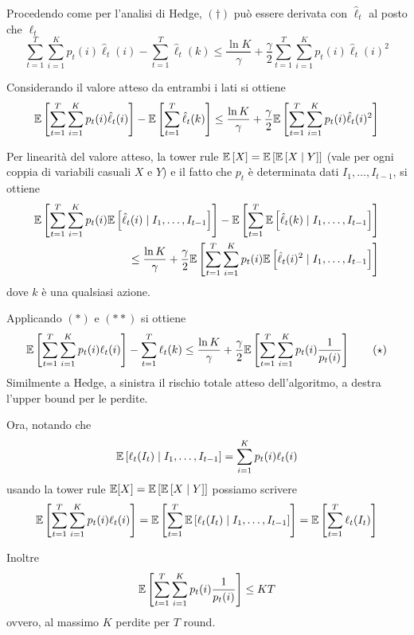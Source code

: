 Procedendo come per l'analisi di Hedge, $(\dag)$ può essere derivata con $\hat \ell_t$ al posto che $\ell_t$
$$ \sum_{t = 1}^T \sum_{i = 1}^K p_t (i) \hat \ell_t (i) - \sum_{t = 1}^T \hat \ell_t (k) \leq \frac{\ln K}{\gamma} + \frac{\gamma}{2} \sum_{t = 1}^T \sum_{i = 1}^K p_t (i) \hat \ell_t (i)^2 $$

Considerando il valore atteso da entrambi i lati si ottiene
$$ \mathbb{E} \left[\sum_{t = 1}^T \sum_{i = 1}^K p_t (i) \hat \ell_t (i)\right] - \mathbb{E} \left[\sum_{t = 1}^T \hat \ell_t (k)\right] \leq \frac{\ln K}{\gamma} + \frac{\gamma}{2} \mathbb{E} \left[\sum_{t = 1}^T \sum_{i = 1}^K p_t (i) \hat \ell_t (i)^2\right] $$

Per linearità del valore atteso, la tower rule $\mathbb{E} \left[X\right] = \mathbb{E} \left[\mathbb{E} \left[X \mid Y\right]\right]$ (vale per ogni coppia di variabili casuali $X$ e $Y$) e il fatto che $p_t$ è determinata dati $I_1, \dots, I_{t-1}$, si ottiene
\begin{align*}
    \mathbb{E} \left[\sum_{t = 1}^T \sum_{i = 1}^K p_t (i) \mathbb{E} \left[ \hat \ell_t (i) \mid I_1, \dots, I_{t-1}\right]\right] - \mathbb{E} \left[\sum_{t = 1}^T \mathbb{E} \left[\hat \ell_t (k) \mid I_1, \dots, I_{t-1} \right]\right] \\
    \leq \frac{\ln K}{\gamma} + \frac{\gamma}{2} \mathbb{E} \left[\sum_{t = 1}^T \sum_{i = 1}^K p_t(i) \mathbb{E} \left[\hat \ell_t (i)^2 \mid I_1, \dots, I_{t-1}\right]\right]
\end{align*}
dove $k$ è una qualsiasi azione. 

Applicando $(\ast)$ e $(\ast \ast)$ si ottiene
\[
\mathbb{E} \left[\sum_{t = 1}^T \sum_{i = 1}^K p_t (i) \ell_t (i)\right] - \sum_{t = 1}^T \ell_t (k) \leq \frac{\ln K}{\gamma} + \frac{\gamma}{2} \mathbb{E} \left[\sum_{t = 1}^T \sum_{i = 1}^K p_t (i) \frac{1}{p_t (i)}\right] \tag*{($\star$)}
\]
Similmente a Hedge, a sinistra il rischio totale atteso dell'algoritmo, a destra l'upper bound per le perdite.

Ora, notando che
$$ \mathbb{E} \left[\ell_t (I_t) \mid I_1, \dots, I_{t-1}\right] = \sum_{i = 1}^K p_t (i) \ell_t (i) $$
usando la tower rule $\mathbb{E} [X]  = \mathbb{E}\left[\mathbb{E} \left[X \mid Y \right]\right]$ possiamo scrivere
$$ \mathbb{E} \left[\sum_{t = 1}^T \sum_{i = 1}^K p_t (i) \ell_t (i)\right] = \mathbb{E} \left[\sum_{t = 1}^T \mathbb{E} \left[\ell_t (I_t) \mid I_1, \dots, I_{t-1}\right]\right] = \mathbb{E} \left[\sum_{t = 1}^T \ell_t (I_t) \right] $$

Inoltre
$$ \mathbb{E} \left[\sum_{t = 1}^T \sum_{i = 1}^K p_t(i) \frac{1}{p_t (i)}\right] \leq KT $$
ovvero, al massimo $K$ perdite per $T$ round.

